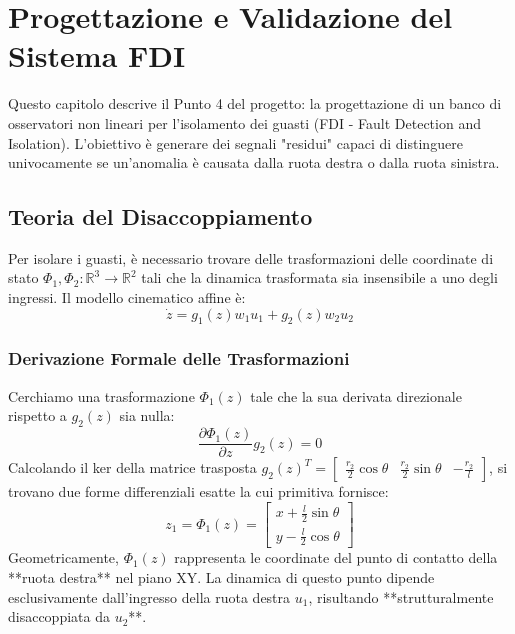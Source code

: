 \chapter{Progettazione e Validazione del Sistema FDI} \label{chap:fdi}

Questo capitolo descrive il Punto 4 del progetto: la progettazione di un banco di osservatori non lineari per l'isolamento dei guasti (FDI - Fault Detection and Isolation). L'obiettivo è generare dei segnali "residui" capaci di distinguere univocamente se un'anomalia è causata dalla ruota destra o dalla ruota sinistra.

\section{Teoria del Disaccoppiamento}
Per isolare i guasti, è necessario trovare delle trasformazioni delle coordinate di stato \( \Phi_1, \Phi_2 : \mathbb{R}^3 \to \mathbb{R}^2 \) tali che la dinamica trasformata sia insensibile a uno degli ingressi.
Il modello cinematico affine è:
\begin{equation}
    \dot{z} = g_1(z) w_1 u_1 + g_2(z) w_2 u_2
\end{equation}

\subsection{Derivazione Formale delle Trasformazioni}
Cerchiamo una trasformazione \( \Phi_1(z) \) tale che la sua derivata direzionale rispetto a \( g_2(z) \) sia nulla:
\begin{equation}
    \frac{\partial \Phi_1(z)}{\partial z} g_2(z) = 0
\end{equation}
Calcolando il ker della matrice trasposta \( g_2(z)^T = \begin{bmatrix} \frac{r_2}{2}\cos\theta & \frac{r_2}{2}\sin\theta & -\frac{r_2}{l} \end{bmatrix} \), si trovano due forme differenziali esatte la cui primitiva fornisce:
\begin{equation}
    z_1 = \Phi_1(z) = \begin{bmatrix} x + \frac{l}{2}\sin\theta \\ y - \frac{l}{2}\cos\theta \end{bmatrix}
\end{equation}
Geometricamente, \( \Phi_1(z) \) rappresenta le coordinate del punto di contatto della **ruota destra** nel piano XY. La dinamica di questo punto dipende esclusivamente dall'ingresso della ruota destra \( u_1 \), risultando **strutturalmente disaccoppiata da \( u_2 \)**.

